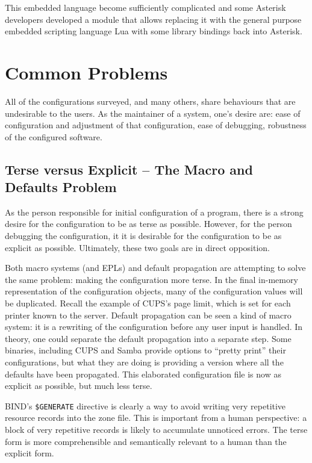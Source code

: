 \documentclass[letterpaper,twocolumn,10pt]{article}
\begin{document}
This embedded language become sufficiently complicated and some Asterisk developers developed a module that allows replacing it with the general purpose embedded scripting language Lua with some library bindings back into Asterisk.

\section{Common Problems}
All of the configurations surveyed, and many others, share behaviours that are undesirable to the users. As the maintainer of a system, one's desire are: ease of configuration and adjustment of that configuration, ease of debugging, robustness of the configured software.

\subsection{Terse versus Explicit -- The Macro and Defaults Problem}
As the person responsible for initial configuration of a program, there is a strong desire for the configuration to be as terse as possible. However, for the person debugging the configuration, it it is desirable for the configuration to be as explicit as possible. Ultimately, these two goals are in direct opposition.

Both macro systems (and EPLs) and default propagation are attempting to solve the same problem: making the configuration more terse. In the final in-memory representation of the configuration objects, many of the configuration values will be duplicated. Recall the example of CUPS's page limit, which is set for each printer known to the server. Default propagation can be seen a kind of macro system: it is a rewriting of the configuration before any user input is handled. In theory, one could separate the default propagation into a separate step. Some binaries, including CUPS and Samba provide options to ``pretty print'' their configurations, but what they are doing is providing a version where all the defaults have been propagated. This elaborated configuration file is now as explicit as possible, but much less terse.

BIND's \texttt{\$GENERATE} directive is clearly a way to avoid writing very repetitive resource records into the zone file. This is important from a human perspective: a block of very repetitive records is likely to accumulate unnoticed errors. The terse form is more comprehensible and semantically relevant to a human than the explicit form.
\end{document}
